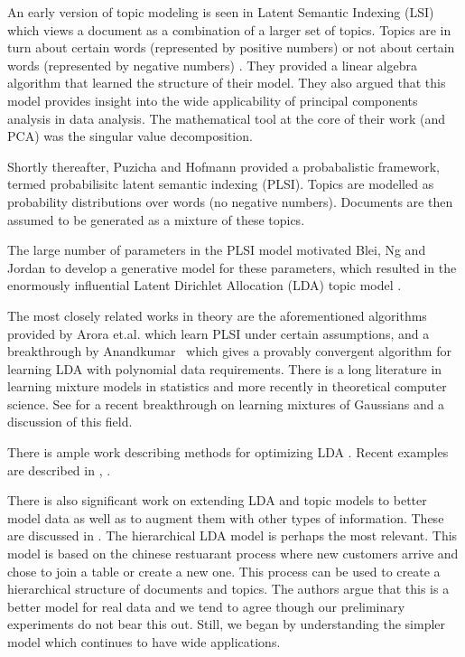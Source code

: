 An early version of topic modeling is seen in Latent Semantic
Indexing (LSI) which views a document as a combination of a larger
set of topics.  Topics are in turn about certain words
(represented by positive numbers) or not about certain words
(represented by negative numbers) \cite{Papadimitriou1997}.  They
provided a linear algebra algorithm that learned the structure
of their model.  They also argued that this model provides
insight into the wide applicability of principal
components analysis in data analysis. The mathematical tool at the core
of their work (and PCA) was the singular value
decomposition.

Shortly thereafter, Puzicha and Hofmann \cite{Hofmann04} provided a
probabalistic framework, termed probabilisitc latent
semantic indexing (PLSI). Topics are modelled as probability
distributions over words (no negative numbers). Documents are
then assumed to be generated as a mixture of these
topics. 

The large number of parameters in the PLSI model motivated
Blei, Ng and Jordan to develop a generative model for these parameters,
which resulted in the enormously influential Latent Dirichlet
Allocation (LDA) topic model \cite{Blei2003a}.

The most closely related works in theory are the aforementioned
algorithms provided by Arora et.al. \cite{Arora2012} which learn PLSI
under certain assumptions, and a breakthrough by
Anandkumar~\cite{AnandLDA} which gives a provably convergent algorithm
for learning LDA with polynomial data requirements.  There is a long
literature in learning mixture models in statistics and
more recently in theoretical computer science. See
\cite{MoitraValiant} for a recent breakthrough on learning mixtures of
Gaussians and a discussion of this field.

There is ample work describing methods for optimizing
LDA \cite{BleiCACM}.  Recent examples are described
in \cite{McCallumMALLET}, \cite{BleiCBA}. 

There is also significant work on extending LDA and topic models to
better model data as well as to augment them with other types of
information.  These are discussed in \cite{BleiCACM}.  The
hierarchical LDA model \cite{BleiCM} is perhaps the most relevant.
This model is based on the chinese restuarant process where new
customers arrive and chose to join a table or create a new one.  This
process can be used to create a hierarchical structure of documents
and topics. The authors argue that this is a better model for real
data and we tend to agree though our preliminary experiments do not
bear this out.  Still, we began by understanding the simpler model
which continues to have wide applications.

